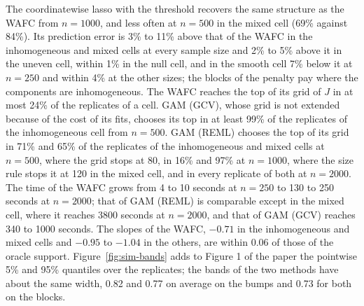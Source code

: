 \documentclass[10pt]{book}
\theoremstyle{definition}
\begin{document}
{The coordinatewise lasso with the threshold recovers the same structure as
the WAFC from $n = 1000$, and less often at $n = 500$ in the mixed cell (69\%
against 84\%). Its prediction error is 3\% to 11\% above that of the WAFC in
the inhomogeneous and mixed cells at every sample size and 2\% to 5\% above
it in the uneven cell, within 1\% in the null cell, and in the smooth cell
7\% below it at $n = 250$ and within 4\% at the other sizes; the blocks of
the penalty pay where the components are inhomogeneous. The WAFC reaches the
top of its grid of $J$ in at most 24\% of the replicates of a cell. GAM
(GCV), whose grid is not extended because of the cost of its fits, chooses
its top in at least 99\% of the replicates of the inhomogeneous cell from
$n = 500$. GAM (REML) chooses the top of its grid in 71\% and 65\% of the
replicates of the inhomogeneous and mixed cells at $n = 500$, where the grid
stops at 80, in 16\% and 97\% at $n = 1000$, where the size rule stops it at
120 in the mixed cell, and in every replicate of both at $n = 2000$. The time
of the WAFC grows from 4 to 10 seconds at $n = 250$ to 130 to 250 seconds at
$n = 2000$; that of GAM (REML) is comparable except in the mixed cell, where
it reaches 3800 seconds at $n = 2000$, and that of GAM (GCV) reaches 340 to
1000 seconds. The slopes of the WAFC, $-0.71$ in the inhomogeneous and mixed
cells and $-0.95$ to $-1.04$ in the others, are within 0.06 of those of the
oracle support. Figure~\ref{fig:sim-bands} adds to Figure 1 of the paper the
pointwise 5\% and 95\% quantiles over the replicates; the bands of the two
methods have about the same width, 0.82 and 0.77 on average on the bumps and
0.73 for both on the blocks.






}

\clearpage
\end{document}

